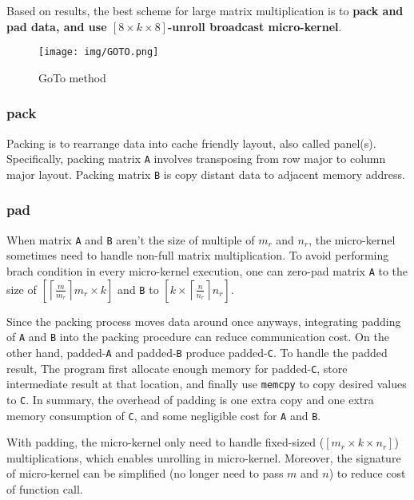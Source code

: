 \documentclass[12pt]{article}
\begin{document}
Based on results, the best scheme for large matrix multiplication is to 
\textbf{pack and pad data, and use $[8\times k\times 8]$-unroll broadcast micro-kernel}.


\begin{figure}[h]
    \centering
    \texttt{[image: img/GOTO.png]} %
    \caption{GoTo method}
    \label{fig:GOTO}
\end{figure}



\subsubsection{pack}
Packing is to rearrange data into cache friendly layout, also called panel(s).
Specifically, packing matrix \texttt{A} involves transposing from row major to column major layout.
Packing matrix \texttt{B} is copy distant data to adjacent memory address.

\subsubsection{pad}
When matrix \texttt{A} and \texttt{B} aren't the size of multiple of $m_r$ and $n_r$,
the micro-kernel sometimes need to handle non-full matrix multiplication.
To avoid performing brach condition in every micro-kernel execution, 
one can zero-pad matrix \texttt{A} to the size of
$\left[\left\lceil \frac{m}{m_r} \right\rceil m_r \times k \right]$ 
and \texttt{B} to $\left[k \times \left\lceil \frac{n}{n_r} \right\rceil n_r \right]$.

Since the packing process moves data around once anyways,
integrating padding of \texttt{A} and \texttt{B} into the packing procedure can 
reduce communication cost.
On the other hand, padded-\texttt{A} and padded-\texttt{B} produce padded-\texttt{C}.
To handle the padded result,
The program first allocate enough memory for padded-\texttt{C}, 
store intermediate result at that location,
and finally use \texttt{memcpy} to copy desired values to \texttt{C}.
In summary, the overhead of padding is 
one extra copy and one extra memory consumption of \texttt{C}, 
and some negligible cost for \texttt{A} and \texttt{B}.

With padding, the micro-kernel only need to handle 
fixed-sized ($[m_r \times k \times n_r]$) multiplications, 
which enables unrolling in micro-kernel.
Moreover, the signature of micro-kernel can be simplified (no longer need to pass $m$ and $n$) 
to reduce cost of function call.
\end{document}
